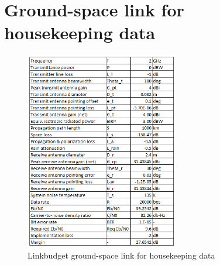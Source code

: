 \documentclass[11pt]{report}
\begin{document}
\newpage
\section{Ground-space link for housekeeping data}
\begin{figure}[ht]
\centering
\includegraphics[width=0.6\textwidth, angle=0]{img/GShousekeepinglinkbudget.png}
\caption{Linkbudget ground-space link for housekeeping data}
\label{figSSbudget}
\end{figure}
\end{document}
